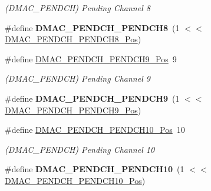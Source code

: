 \begin{DoxyCompactItemize}
\begin{DoxyCompactList}\small\item\em (D\+M\+A\+C\+\_\+\+P\+E\+N\+D\+C\+H) Pending Channel 8 \end{DoxyCompactList}\item 
\hypertarget{group___s_a_m_l21___d_m_a_c_ga1fb0d54edf5a017441054a0a6325f34b}{}\#define {\bfseries D\+M\+A\+C\+\_\+\+P\+E\+N\+D\+C\+H\+\_\+\+P\+E\+N\+D\+C\+H8}~(1 $<$$<$ \hyperlink{group___s_a_m_l21___d_m_a_c_ga907776d2406a117c2e64b3520493d30c}{D\+M\+A\+C\+\_\+\+P\+E\+N\+D\+C\+H\+\_\+\+P\+E\+N\+D\+C\+H8\+\_\+\+Pos})\label{group___s_a_m_l21___d_m_a_c_ga1fb0d54edf5a017441054a0a6325f34b}

\item 
\hypertarget{group___s_a_m_l21___d_m_a_c_ga5de621ea46f932622f8b77ee5c82db41}{}\#define \hyperlink{group___s_a_m_l21___d_m_a_c_ga5de621ea46f932622f8b77ee5c82db41}{D\+M\+A\+C\+\_\+\+P\+E\+N\+D\+C\+H\+\_\+\+P\+E\+N\+D\+C\+H9\+\_\+\+Pos}~9\label{group___s_a_m_l21___d_m_a_c_ga5de621ea46f932622f8b77ee5c82db41}

\begin{DoxyCompactList}\small\item\em (D\+M\+A\+C\+\_\+\+P\+E\+N\+D\+C\+H) Pending Channel 9 \end{DoxyCompactList}\item 
\hypertarget{group___s_a_m_l21___d_m_a_c_ga2bcfd1b17492a37ff29d7e218bec9a77}{}\#define {\bfseries D\+M\+A\+C\+\_\+\+P\+E\+N\+D\+C\+H\+\_\+\+P\+E\+N\+D\+C\+H9}~(1 $<$$<$ \hyperlink{group___s_a_m_l21___d_m_a_c_ga5de621ea46f932622f8b77ee5c82db41}{D\+M\+A\+C\+\_\+\+P\+E\+N\+D\+C\+H\+\_\+\+P\+E\+N\+D\+C\+H9\+\_\+\+Pos})\label{group___s_a_m_l21___d_m_a_c_ga2bcfd1b17492a37ff29d7e218bec9a77}

\item 
\hypertarget{group___s_a_m_l21___d_m_a_c_ga6814eb4f939c25360f1423fc33d273b7}{}\#define \hyperlink{group___s_a_m_l21___d_m_a_c_ga6814eb4f939c25360f1423fc33d273b7}{D\+M\+A\+C\+\_\+\+P\+E\+N\+D\+C\+H\+\_\+\+P\+E\+N\+D\+C\+H10\+\_\+\+Pos}~10\label{group___s_a_m_l21___d_m_a_c_ga6814eb4f939c25360f1423fc33d273b7}

\begin{DoxyCompactList}\small\item\em (D\+M\+A\+C\+\_\+\+P\+E\+N\+D\+C\+H) Pending Channel 10 \end{DoxyCompactList}\item 
\hypertarget{group___s_a_m_l21___d_m_a_c_gae451df524feca7e6996c3245eeb26104}{}\#define {\bfseries D\+M\+A\+C\+\_\+\+P\+E\+N\+D\+C\+H\+\_\+\+P\+E\+N\+D\+C\+H10}~(1 $<$$<$ \hyperlink{group___s_a_m_l21___d_m_a_c_ga6814eb4f939c25360f1423fc33d273b7}{D\+M\+A\+C\+\_\+\+P\+E\+N\+D\+C\+H\+\_\+\+P\+E\+N\+D\+C\+H10\+\_\+\+Pos})\label{group___s_a_m_l21___d_m_a_c_gae451df524feca7e6996c3245eeb26104}


\end{DoxyCompactItemize}

